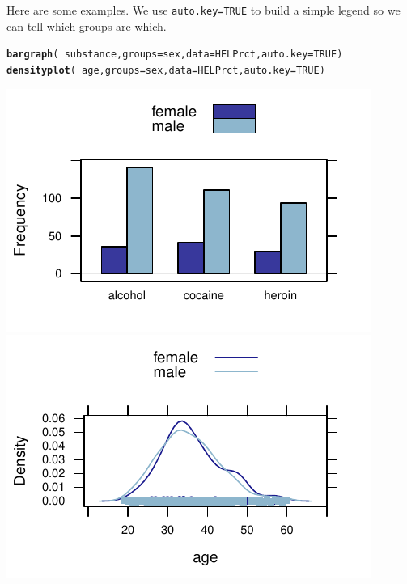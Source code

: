\documentclass[twoside]{book}\usepackage[]{graphicx}\usepackage[]{xcolor}
\makeatletter
\def\maxwidth{ %
  \ifdim\Gin@nat@width>\linewidth
    \linewidth
  \else
    \Gin@nat@width
  \fi
}
\newcommand{\hlnum}[1]{\textcolor[rgb]{0.686,0.059,0.569}{#1}}%
\newcommand{\hlopt}[1]{\textcolor[rgb]{0,0,0}{#1}}%
\newcommand{\hlstd}[1]{\textcolor[rgb]{0.345,0.345,0.345}{#1}}%
\newcommand{\hlkwc}[1]{\textcolor[rgb]{0.333,0.667,0.333}{#1}}%
\newcommand{\hlkwd}[1]{\textcolor[rgb]{0.737,0.353,0.396}{\textbf{#1}}}%
\newenvironment{kframe}{%
 \def\at@end@of@kframe{}%
 \ifinner\ifhmode%
  \def\at@end@of@kframe{\end{minipage}}%
  \begin{minipage}{\columnwidth}%
 \fi\fi%
 \def\FrameCommand##1{\hskip\@totalleftmargin \hskip-\fboxsep
 \colorbox{shadecolor}{##1}\hskip-\fboxsep
     \hskip-\linewidth \hskip-\@totalleftmargin \hskip\columnwidth}%
 \MakeFramed {\advance\hsize-\width
   \@totalleftmargin\z@ \linewidth\hsize
   \@setminipage}}%
 {\par\unskip\endMakeFramed%
 \at@end@of@kframe}
\newenvironment{knitrout}{}{} %
\newcommand{\argument}[1]{{\color{brown!80!black}\texttt{#1}}}
\newcounter{example}[section]
\makeatother
\begin{document}
Here are some examples.  We use \argument{auto.key=TRUE} to build 
a simple legend so we can tell which groups are which.
\begin{knitrout}
\color{fgcolor}\begin{kframe}
\begin{alltt}
\hlkwd{bargraph}\hlstd{(}\hlopt{~}\hlstd{substance,} \hlkwc{groups}\hlstd{=sex,} \hlkwc{data}\hlstd{=HELPrct,} \hlkwc{auto.key}\hlstd{=}\hlnum{TRUE}\hlstd{)}
\hlkwd{densityplot}\hlstd{(}\hlopt{~}\hlstd{age,} \hlkwc{groups}\hlstd{=sex,} \hlkwc{data}\hlstd{=HELPrct,} \hlkwc{auto.key}\hlstd{=}\hlnum{TRUE}\hlstd{)}
\end{alltt}
\end{kframe}

{\centering \includegraphics[width=\maxwidth]{figures/fig-groups-1} 
\includegraphics[width=\maxwidth]{figures/fig-groups-2} 

}



\end{knitrout}
\end{document}
